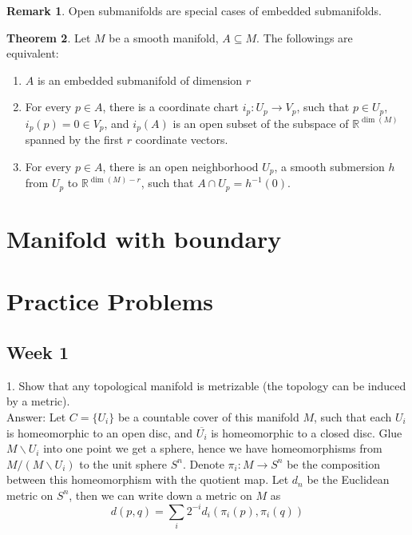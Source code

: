\documentclass{article}
\theoremstyle{definition}
\newtheorem{thm}{Theorem}[section]
\newtheorem{rmk}[thm]{Remark}
\begin{document}
\begin{rmk}
    Open submanifolds are special cases of embedded submanifolds.
\end{rmk}

\begin{thm}
    Let $M$ be a smooth manifold, $A\subseteq M$. The followings are equivalent:
    \begin{enumerate}
        \item $A$ is an embedded submanifold of dimension $r$
        \item For every $p\in A$, there is a coordinate chart $i_p: U_p\rightarrow V_p$, such that $p\in U_p$, $i_p(p)=0\in V_p$, and $i_p(A)$ is an open subset of the subspace of $\mathbb{R}^{\dim(M)}$ spanned by the first $r$ coordinate vectors.
        \item For every $p\in A$, there is an open neighborhood $U_p$, a smooth submersion $h$ from $U_p$ to $\mathbb{R}^{\dim(M)-r}$, such that $A\cap U_p=h^{-1}(0)$.
    \end{enumerate}
\end{thm}


\newpage

\section{Manifold with boundary}

\appendix

\section{Practice Problems}

\subsection{Week 1}

1. Show that any topological manifold is metrizable (the topology can be induced by a metric).\\

Answer: Let $C=\{U_i\}$ be a countable cover of this manifold $M$, such that each $U_i$ is homeomorphic to an open disc, and $\overline{U_i}$ is homeomorphic to a closed disc. Glue $M\backslash U_i$ into one point we get a sphere, hence we have homeomorphisms from $M/(M\backslash U_i)$ to the unit sphere $S^n$. Denote $\pi_i: M\rightarrow S^n$ be the composition between this homeomorphism with the quotient map. Let $d_n$ be the Euclidean metric on $S^n$, then we can write down a metric on $M$ as 
\[d(p, q)=\sum_i 2^{-i}d_i(\pi_i(p), \pi_i(q))\]
\end{document}
